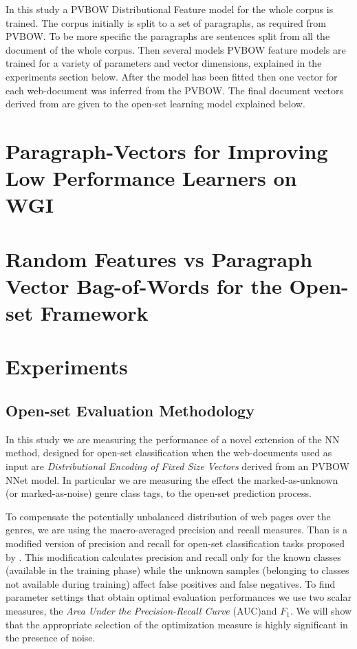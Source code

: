 In this study a PVBOW Distributional Feature model for the whole corpus is trained. The corpus initially is split to a set of paragraphs, as required from PVBOW. To be more specific the paragraphs are sentences split from all the document of the whole corpus. Then several models PVBOW feature models are trained for a variety of parameters and vector dimensions, explained in the experiments section below. After the model has been fitted then one vector for each web-document was inferred from the PVBOW. The final document vectors derived from  are given to the open-set learning model explained below. 



\section{Paragraph-Vectors for Improving Low Performance Learners on WGI} \label{chap:word_embedding:sec:all_algorithms_test_with_doc2vec}


\section{Random Features vs Paragraph Vector Bag-of-Words for the Open-set Framework} \label{chap:word_embedding:sec:last_paper_presentation}







\section{Experiments}\label{chap:word_embedding:sec:experimental_setup}

\subsection{Open-set Evaluation Methodology}
In this study we are measuring the performance of a novel extension of the NN method, designed for open-set classification when the web-documents used as input are \textit{Distributional Encoding of Fixed Size Vectors} derived from an PVBOW NNet model. In particular we are measuring the effect the marked-as-unknown (or marked-as-noise) genre class tags, to the open-set prediction process.

To compensate the potentially unbalanced distribution of web pages over the genres, we are using the macro-averaged precision and recall measures. Than is a modified version of precision and recall for open-set classification tasks proposed by \cite{mendesjunior2016}. This modification calculates precision and recall only for the known classes (available in the training phase) while the unknown samples (belonging to classes not available during training) affect false positives and false negatives. To find parameter settings that obtain optimal evaluation performances we use two scalar measures, the \textit{Area Under the Precision-Recall Curve} (AUC)and $F_{1}$. We will show that the appropriate selection of the optimization measure is highly significant in the presence of noise.

